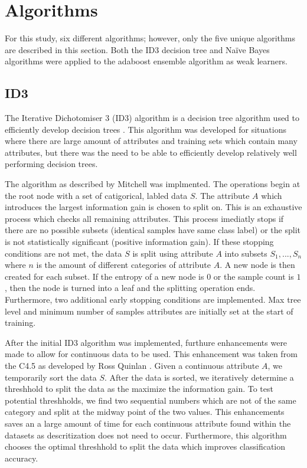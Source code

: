 \documentclass[11pt]{article}
\begin{document}
\section{Algorithms}
For this study, six different algorithms; however, only the five unique algorithms are described in this section. Both the ID3 decision tree and Naïve Bayes algorithms were applied to the adaboost ensemble algorithm as weak learners.

\subsection{ID3}
The Iterative Dichotomiser 3 (ID3) algorithm is a decision tree algorithm used to efficiently develop decision trees \cite{Quinlan:1986:IDT:637962.637969}. This algorithm was developed for situations where there are large amount of attributes and training sets which contain many attributes, but there was the need to be able to efficiently develop relatively well performing decision trees.

The algorithm as described by Mitchell \cite{Mitchell:1997:ML:541177} was implmented. The operations begin at the root node with a set of catigorical, labled data $S$. The attribute $A$ which introduces the largest information gain is chosen to split on. This is an exhaustive process which checks all remaining attributes. This process imediatly stops if there are no possible subsets (identical samples have same class label) or the split is not statistically significant (positive information gain). If these stopping conditions are not met, the data $S$ is split using attribute $A$ into subsets ${S_1,...,S_n}$ where $n$ is the amount of different categories of attribute $A$. A new node is then created for each subset. If the entropy of a new node is $0$ or the sample count is $1$, then the node is turned into a leaf and the splitting operation ends. Furthermore, two additional early stopping conditions are implemented. Max tree level and minimum number of samples attributes are initially set at the start of training.

After the initial ID3 algorithm was implemented, furthure enhancements were made to allow for continuous data to be used. This enhancement was taken from the C4.5  as developed by Ross Quinlan \citep{c45algorithm}. Given a continuous attribute $A$, we temporarily sort the data $S$. After the data is sorted, we iteratively determine a threshhold to split the data as the maximize the information gain. To test potential threshholds, we find two sequential numbers which are not of the same category and split at the midway point of the two values. This enhancements saves an a large amount of time for each continuous attribute found within the datasets as descritization does not need to occur. Furthermore, this algorithm chooses the optimal threshhold to split the data which improves classification accuracy.
\end{document}
